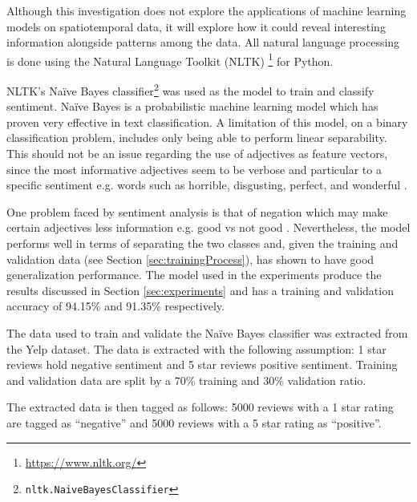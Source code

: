 Although this investigation does not explore the applications of machine learning models on spatiotemporal data, it will explore how it could reveal interesting information alongside patterns among the data. All natural language processing is done using the Natural Language Toolkit (NLTK)
\footnote{\url{https://www.nltk.org/}} for Python.

NLTK's Na\"ive Bayes classifier\footnote{\texttt{nltk.NaiveBayesClassifier}} was used as the model to train and classify sentiment. Na\"ive Bayes is a probabilistic machine learning model which has proven very effective in text classification. A limitation of this model, on a binary classification problem, includes only being able to perform linear separability. This should not be an issue regarding the use of adjectives as feature vectors, since the most informative adjectives seem to be verbose and particular to a specific sentiment e.g. words such as horrible, disgusting, perfect, and wonderful \cite{rish2001empirical}.

One problem faced by sentiment analysis is that of negation which may make certain adjectives less information e.g. good vs not good \cite{blanco2011some}. Nevertheless, the model performs well in terms of separating the two classes and, given the training and validation data (see Section \ref{sec:trainingProcess}), has shown to have good generalization performance. The model used in the experiments  produce the results discussed in Section \ref{sec:experiments} and has a training and validation accuracy of 94.15\% and 91.35\% respectively.

\label{sec:trainingProcess}


The data used to train and validate the Na\"ive Bayes classifier was extracted from the Yelp dataset. The data is extracted with the following assumption: 1 star reviews hold negative sentiment and 5 star reviews positive sentiment. Training and validation data are split by a 70\% training and 30\% validation ratio.

The extracted data is then tagged as follows: 5000 reviews with a 1 star rating are tagged as ``negative'' and 5000 reviews with a 5 star rating as ``positive''.

